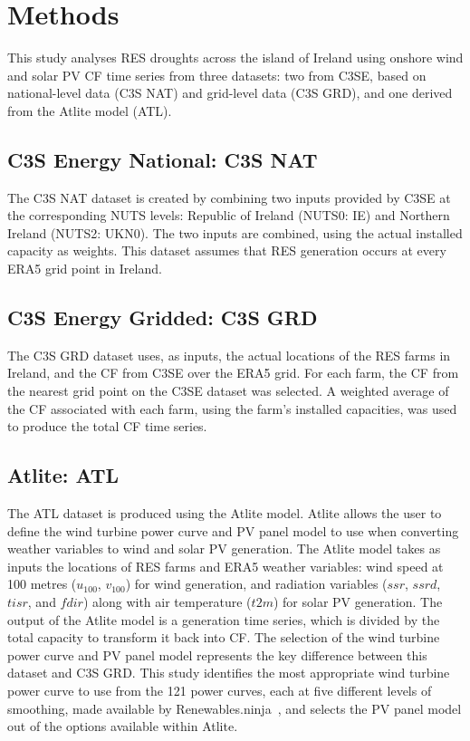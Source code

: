 \documentclass[preprint, 12pt]{elsarticle}
\begin{document}
\section{Methods}
\label{sec:methods}

This study analyses RES droughts across the island of Ireland using onshore wind and solar PV CF time series from three datasets: two from C3SE, based on national-level data (C3S NAT) and grid-level data (C3S GRD), and one derived from the Atlite model (ATL). 

\subsection{C3S Energy National: C3S NAT}
\label{sec:c3se_n}

The C3S NAT dataset is created by combining two inputs provided by C3SE at the corresponding NUTS levels: Republic of Ireland (NUTS0: IE) and Northern Ireland (NUTS2: UKN0). The two inputs are combined, using the actual installed capacity as weights. This dataset assumes that RES generation occurs at every ERA5 grid point in Ireland. 

\subsection{C3S Energy Gridded: C3S GRD}
\label{sec:c3se_g}

The C3S GRD dataset uses, as inputs, the actual locations of the RES farms in Ireland, and the CF from C3SE over the ERA5 grid. For each farm, the CF from the nearest grid point on the C3SE dataset was selected. A weighted average of the CF associated with each farm, using the farm's installed capacities, was used to produce the total CF time series.

\subsection{Atlite: ATL} 
\label{sec:atlite}

The ATL dataset is produced using the Atlite model. Atlite allows the user to define the wind turbine power curve and PV panel model to use when converting weather variables to wind and solar PV generation. The Atlite model takes as inputs the locations of RES farms and ERA5 weather variables: wind speed at 100 metres ($u_{100}$, $v_{100}$) for wind generation, and radiation variables ($ssr$, $ssrd$, $tisr$, and $fdir$) along with air temperature ($t2m$) for solar PV generation. The output of the Atlite model is a generation time series, which is divided by the total capacity to transform it back into CF. The selection of the wind turbine power curve and PV panel model represents the key difference between this dataset and C3S GRD. This study identifies the most appropriate wind turbine power curve to use from the 121 power curves, each at five different levels of smoothing, made available by Renewables.ninja~\citep{staffell2016wake}, and selects the PV panel model out of the options available within Atlite.
\end{document}
